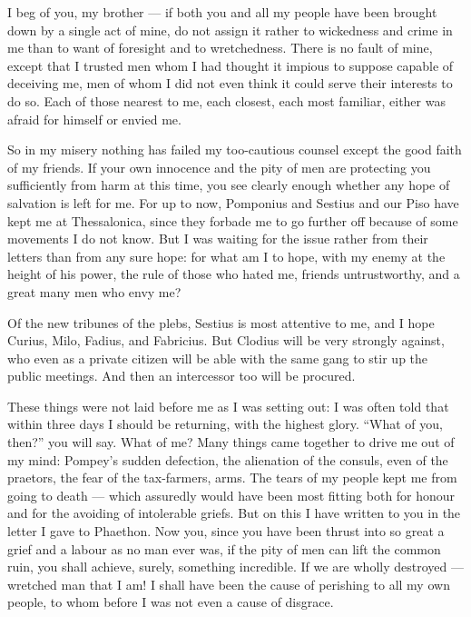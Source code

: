 

 I beg of you, my brother --- if both you and all my people have been brought down by a single act of mine, do not assign it rather to wickedness and crime in me than to want of foresight and to wretchedness. There is no fault of mine, except that I trusted men whom I had thought it impious to suppose capable of deceiving me, men of whom I did not even think it could serve their interests to do so. Each of those nearest to me, each closest, each most familiar, either was afraid for himself or envied me.

 So in my misery nothing has failed my too-cautious counsel except the good faith of my friends. If your own innocence and the pity of men are protecting you sufficiently from harm at this time, you see clearly enough whether any hope of salvation is left for me. For up to now, Pomponius and Sestius and our Piso have kept me at Thessalonica, since they forbade me to go further off because of some movements I do not know. But I was waiting for the issue rather from their letters than from any sure hope: for what am I to hope, with my enemy at the height of his power, the rule of those who hated me, friends untrustworthy, and a great many men who envy me?

 Of the new tribunes of the plebs, Sestius is most attentive to me, and I hope Curius, Milo, Fadius, and Fabricius. But Clodius will be very strongly against, who even as a private citizen will be able with the same gang to stir up the public meetings. And then an intercessor too will be procured.

 These things were not laid before me as I was setting out: I was often told that within three days I should be returning, with the highest glory. ``What of you, then?'' you will say. What of me? Many things came together to drive me out of my mind: Pompey's sudden defection, the alienation of the consuls, even of the praetors, the fear of the tax-farmers, arms. The tears of my people kept me from going to death --- which assuredly would have been most fitting both for honour and for the avoiding of intolerable griefs. But on this I have written to you in the letter I gave to Phaethon. Now you, since you have been thrust into so great a grief and a labour as no man ever was, if the pity of men can lift the common ruin, you shall achieve, surely, something incredible. If we are wholly destroyed --- wretched man that I am! I shall have been the cause of perishing to all my own people, to whom before I was not even a cause of disgrace.

